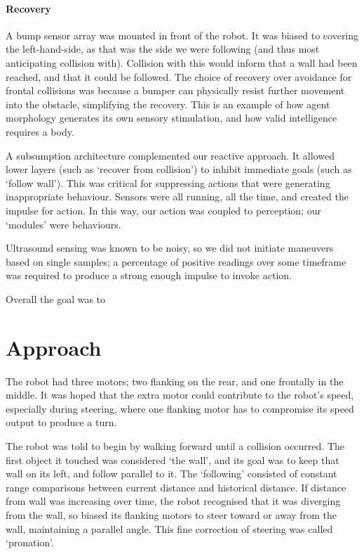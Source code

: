 \documentclass[a4paper,12pt]{article}
\begin{document}
\paragraph{Recovery} A bump sensor array was mounted in front of the robot. It was biased to covering the left-hand-side, as that was the side we were following (and thus most anticipating collision with). Collision with this would inform that a wall had been reached, and that it could be followed. The choice of recovery over avoidance for frontal collisions was because a bumper can physically resist further movement into the obstacle, simplifying the recovery. This is an example of how agent morphology generates its own sensory stimulation\cite{pfeifer2005morphological}, and how valid intelligence requires a body\cite{brooks1991intelligence,pfeifer2005morphological}.

A subsumption architecture\cite{brooks1991intelligence} complemented our reactive approach. It allowed lower layers (such as `recover from collision') to inhibit immediate goals (such as `follow wall'). This was critical for suppressing actions that were generating inappropriate behaviour. Sensors were all running, all the time, and created the impulse for action. In this way, our action was coupled to perception; our `modules' were behaviours.

Ultrasound sensing was known to be noisy, so we did not initiate maneuvers based on single samples; a percentage of positive readings over some timeframe was required to produce a strong enough impulse to invoke action.

Overall the goal was to 
\section{Approach}
The robot had three motors; two flanking on the rear, and one frontally in the middle. It was hoped that the extra motor could contribute to the robot's speed, especially during steering, where one flanking motor has to compromise its speed output to produce a turn.

The robot was told to begin by walking forward until a collision occurred. The first object it touched was considered `the wall', and its goal was to keep that wall on its left, and follow parallel to it. The `following' consisted of constant range comparisons between current distance and historical distance. If distance from wall was increasing over time, the robot recognised that it was diverging from the wall, so biased its flanking motors to steer toward or away from the wall, maintaining a parallel angle. This fine correction of steering was called `pronation'.
\end{document}
